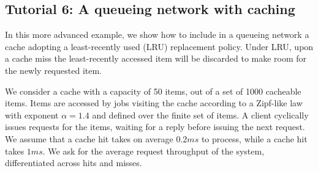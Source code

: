 \subsection{Tutorial 6: A queueing network with caching}
\label{example-6-a-queueing-network-with-caching}
In this more advanced example, we show how to include in a queueing network a cache adopting a least-recently used (LRU) replacement policy. Under LRU, upon a cache miss the least-recently accessed item will be discarded to make room for the newly requested item.

We consider a cache with a capacity of 50 items, out of a set of 1000 cacheable items. Items are accessed by jobs visiting the cache according to a Zipf-like law with exponent $\alpha=1.4$ and defined over the finite set of items. A client cyclically issues requests for the items, waiting for a reply before issuing the next request. We assume that a cache hit takes on average $0.2ms$ to process, while a cache hit takes $1ms$. We ask for the average request throughput of the system, differentiated across hits and misses.


